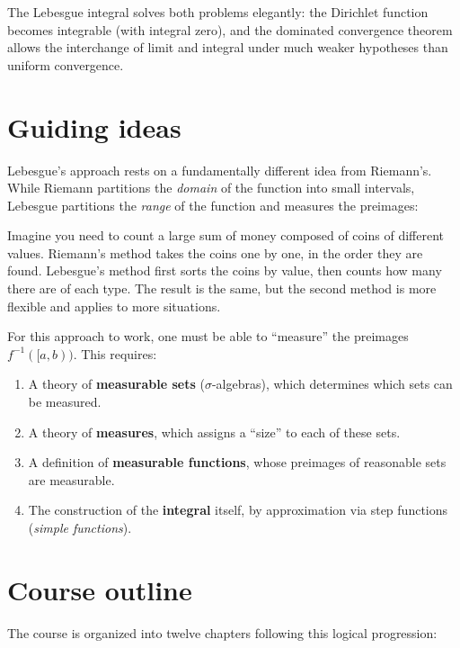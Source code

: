 The Lebesgue integral solves both problems elegantly: the Dirichlet function becomes
integrable (with integral zero), and the dominated convergence theorem allows the
interchange of limit and integral under much weaker hypotheses than uniform
convergence.

\section*{Guiding ideas}

Lebesgue's approach rests on a fundamentally different idea from Riemann's. While
Riemann partitions the \emph{domain} of the function into small intervals, Lebesgue
partitions the \emph{range} of the function and measures the preimages:

\begin{intuition}[title=\textbf{Lebesgue's philosophy}]
Imagine you need to count a large sum of money composed of coins of different values.
Riemann's method takes the coins one by one, in the order they are found. Lebesgue's
method first sorts the coins by value, then counts how many there are of each type.
The result is the same, but the second method is more flexible and applies to more
situations.
\end{intuition}

For this approach to work, one must be able to ``measure'' the preimages
$f^{-1}([a,b))$. This requires:
\begin{enumerate}
    \item A theory of \textbf{measurable sets} ($\sigma$-algebras), which determines
    which sets can be measured.
    \item A theory of \textbf{measures}, which assigns a ``size'' to each of these sets.
    \item A definition of \textbf{measurable functions}, whose preimages of
    reasonable sets are measurable.
    \item The construction of the \textbf{integral} itself, by approximation via
    step functions (\emph{simple functions}).
\end{enumerate}

\section*{Course outline}

The course is organized into twelve chapters following this logical progression:

